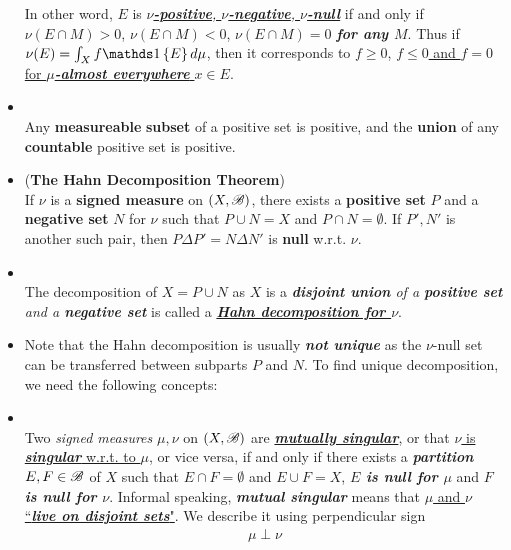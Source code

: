\documentclass[11pt]{article}
\begin{document}
\begin{itemize}
\begin{definition}
In other word, $E$ is \underline{\emph{\textbf{$\nu$-positive}, \textbf{$\nu$-negative}, \textbf{$\nu$-null}}}  if and only if $\nu(E\cap M)>0$, $\nu(E\cap M)<0$, $\nu(E\cap M)=0$ \emph{\textbf{for any $M$}}. Thus if  $\nu(E) = \int_{X}f\ind{E} d\mu $, then it corresponds to \underline{$f\ge 0$}, \underline{$f\le 0$ and $f=0$ for \emph{\textbf{$\mu$-almost everywhere}} $x\in E$}.
\end{definition}

\item \begin{lemma}\citep{folland2013real}\\
Any \textbf{measureable} \textbf{subset} of a positive set is positive, and the \textbf{union} of any \textbf{countable} positive set is positive. 
\end{lemma}

\item \begin{theorem}(\textbf{The Hahn Decomposition Theorem})\citep{folland2013real}\\
If $\nu$ is a \textbf{signed measure} on $(X,{\mathscr B})$, there exists a \textbf{positive set} $P$ and a \textbf{negative set} $N$ for $\nu$ such that $P\cup N= X$ and $P\cap N=\emptyset$. If $P', N'$ is another such pair, then $P\Delta P'= N\Delta N'$ is \textbf{null} w.r.t. $\nu$.
\end{theorem}

\item \begin{definition}\citep{folland2013real, resnick2013probability}\\
The decomposition of $X = P\cup N$ as $X$ is a \emph{\textbf{disjoint union} of a \textbf{positive set} and a \textbf{negative set}} is called a \underline{\emph{\textbf{Hahn decomposition for $\nu$}}}.
\end{definition}

\item \begin{remark}
Note that the Hahn decomposition is usually \emph{\textbf{not unique}} as the $\nu$-null set can be transferred between subparts $P$ and $N$. To find unique decomposition, we need the following concepts:
\end{remark}

\item  \begin{definition}\citep{folland2013real}\\
Two \emph{signed measures} $\mu, \nu$ on $(X,{\mathscr B})$ are \underline{\emph{\textbf{mutually singular}}}, or that \underline{$\nu$ is \emph{\textbf{singular}} w.r.t. to $\mu$}, or vice versa, if and only if there exists a \emph{\textbf{partition}} $E,F\in {\mathscr B}$ of $X$ such that $E\cap F = \emptyset$ and $E\cup F= X$, \emph{\textbf{$E$ is null for $\mu$}} and \emph{\textbf{$F$ is null for $\nu$}}.  Informal speaking, \emph{\textbf{mutual singular}} means that \underline{$\mu$ and $\nu$ ``\emph{\textbf{live on disjoint sets}}"}. We describe it using perpendicular sign
\begin{align*}
\mu \perp \nu
\end{align*}
\end{definition}


\end{itemize}
\end{document}
